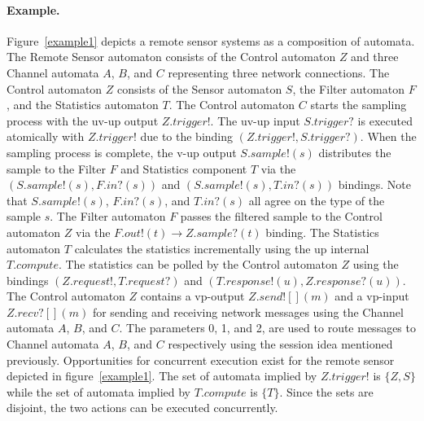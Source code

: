 \paragraph{Example.}
Figure~\ref{example1} depicts a remote sensor systems as a composition of automata.
The Remote Sensor automaton consists of the Control automaton $Z$ and three Channel automata $A$, $B$, and $C$ representing three network connections.
The Control automaton $Z$ consists of the Sensor automaton $S$, the Filter automaton $F$, and the Statistics automaton $T$.
The Control automaton $C$ starts the sampling process with the uv-up output $Z.trigger!$.
The uv-up input $S.trigger?$ is executed atomically with $Z.trigger!$ due to the binding $(Z.trigger!, S.trigger?)$.
When the sampling process is complete, the v-up output $S.sample!(s)$ distributes the sample to the Filter $F$ and Statistics component $T$ via the $(S.sample!(s), F.in?(s))$ and $(S.sample!(s), T.in?(s))$ bindings.
Note that $S.sample!(s)$, $F.in?(s)$, and $T.in?(s)$ all agree on the type of the sample $s$.
The Filter automaton $F$ passes the filtered sample to the Control automaton $Z$ via the $F.out!(t) \to Z.sample?(t)$ binding.
The Statistics automaton $T$ calculates the statistics incrementally using the up internal $T.compute$.
The statistics can be polled by the Control automaton $Z$ using the bindings $(Z.request!, T.request?)$ and $(T.response!(u), Z.response?(u))$.
The Control automaton $Z$ contains a vp-output $Z.send![](m)$ and a vp-input $Z.recv?[](m)$ for sending and receiving network messages using the Channel automata $A$, $B$, and $C$.
The parameters 0, 1, and 2, are used to route messages to Channel automata $A$, $B$, and $C$ respectively using the session idea mentioned previously.
Opportunities for concurrent execution exist for the remote sensor depicted in figure~\ref{example1}.
The set of automata implied by $Z.trigger!$ is $\{Z, S\}$ while the set of automata implied by $T.compute$ is $\{T\}$.
Since the sets are disjoint, the two actions can be executed concurrently.
